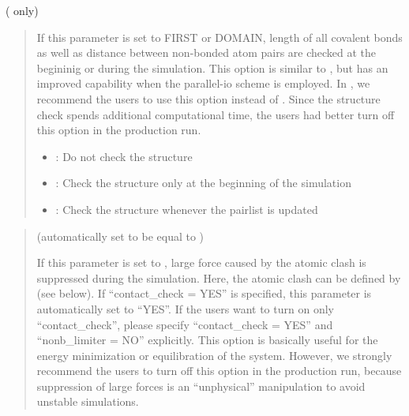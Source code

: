\documentclass[a4paper,11pt,oneside,english]{sphinxmanual}
\begin{document}
  ( only)
\begin{quote}


If this parameter is set to FIRST or DOMAIN, length of all covalent bonds
as well as distance between non-bonded atom pairs are checked at the begininig or during the simulation.
This option is similar to ,
but has an improved capability when the parallel-io scheme is employed.
In , we recommend the users to use this option instead of .
Since the structure check spends additional computational time,
the users had better turn off this option in the production run.
\begin{itemize}
\item {} 
: Do not check the structure

\item {} 
: Check the structure only at the beginning of the simulation

\item {} 
: Check the structure whenever the pairlist is updated

\end{itemize}
\end{quote}

 
\begin{quote}

 (automatically set to be equal to )

If this parameter is set to ,
large force caused by the atomic clash is suppressed during the simulation.
Here, the atomic clash can be defined by  (see below).
If “contact\_check = YES” is specified, this parameter is automatically set to “YES”.
If the users want to turn on only “contact\_check”,
please specify “contact\_check = YES” and “nonb\_limiter = NO” explicitly.
This option is basically useful for the energy minimization or equilibration of the system.
However, we strongly recommend the users to turn off this option in the production run,
because suppression of large forces is an “unphysical” manipulation to avoid unstable simulations.
\end{quote}
\end{document}
